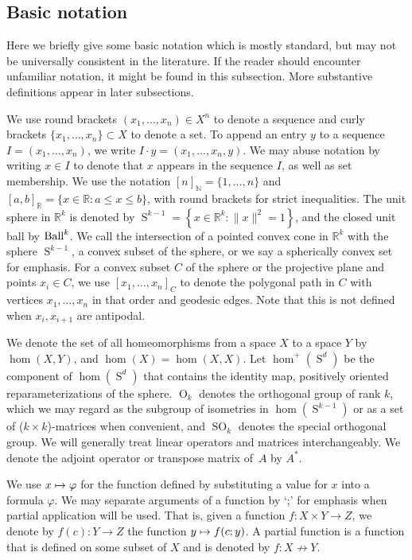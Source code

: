 \documentclass[JEP,XML,SOM,Unicode,NoFloatCountersInSection,published]{cedram}
\newcommand\mto{\mathchoice{\longmapsto}{\mapsto}{\mapsto}{\mapsto}}
\theoremstyle{remark}
\let\mb\mathbb
\DeclareMathOperator{\orth}{O}
\DeclareMathOperator{\sorth}{SO}
\DeclareMathOperator{\sphere}{S}
\newcommand{\Ball}{\text{\rm Ball}}
\begin{document}
\subsection{Basic notation}

Here we briefly give some basic notation which is mostly standard, but may not be universally consistent in the literature. If the reader should encounter unfamiliar notation, it might be found in this subsection. More substantive definitions appear in later subsections.

We use round brackets
$(x_1,\dots,x_n) \in X^n$ to denote a sequence and curly brackets $\{x_1,\dots,x_n\} \subset X$ to denote a set.
To append an entry $y$ to a sequence $I = (x_1,\dots,x_n)$, we write $I \cdot y = (x_1,\dots,x_{n},y)$.
We may abuse notation by writing $x\in I$ to denote that $x$ appears in the sequence $I$, as well as set membership.
We use the notation $[n]_{\mb{N}} = \{1,\dots,n\}$ and $[a,b]_{\mb{R}} = \{x \in \mb{R} : a \leq x \leq b\}$,
with round brackets for strict inequalities.
The unit sphere in $\mb{R}^k$ is denoted by $\sphere^{k-1} = \left\{ x\in \mb{R}^k : \|x\|^2 = 1 \right\}$, and the closed unit ball by $\Ball^k$.
We call the intersection of a pointed convex cone in $\mb{R}^k$ with the sphere $\sphere^{k-1}$, a convex subset of the sphere, or we say a spherically convex set for emphasis.
For a convex subset $C$ of the sphere or the projective plane and points $x_i \in C$, we use $[x_1,\dots,x_n]_C$ to denote the polygonal path in $C$ with vertices $x_1,\dots,x_n$ in that order and geodesic edges. Note that this is not defined when $x_i,x_{i+1}$ are antipodal.

We denote the set of all homeomorphisms from a space $X$ to a space $Y$ by
$\hom(X,Y)$,
and $\hom(X) = \hom(X,X)$.
Let $\hom^+(\sphere^d)$ be
the component of $\hom(\sphere^d)$ that contains the identity map,
\ie positively oriented reparameterizations of the sphere.
$\orth_k$ denotes the orthogonal group of rank $k$, which we may regard as the subgroup of isometries in $\hom(\sphere^{k-1})$ or as a set of ($k\times k$)-matrices when convenient, and $\sorth_k$ denotes the special orthogonal group.
We will generally treat linear operators and matrices interchangeably.
We denote the adjoint operator or transpose matrix of~$A$ by $A^*$.	

We use $x \mto \varphi$ for the function defined by substituting a value for $x$ into a formula $\varphi$.
We may separate arguments of a function by `;' for emphasis when partial application will be used. That is, given a function $f : X \times Y \to Z$, we denote by $f(c) : Y \to Z$ the function $y \mto f(c;y)$.
A partial function is a function that is defined on some subset of $X$ and is denoted by $f:X \not\to Y$.
\end{document}
